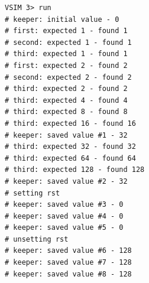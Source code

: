 \begin{code}
\caption{Лог выполнения симуляции \texttt{testbench}.}
\begin{verbatim}
VSIM 3> run
# keeper: initial value - 0
# first: expected 1 - found 1
# second: expected 1 - found 1
# third: expected 1 - found 1
# first: expected 2 - found 2
# second: expected 2 - found 2
# third: expected 2 - found 2
# third: expected 4 - found 4
# third: expected 8 - found 8
# third: expected 16 - found 16
# keeper: saved value #1 - 32
# third: expected 32 - found 32
# third: expected 64 - found 64
# third: expected 128 - found 128
# keeper: saved value #2 - 32
# setting rst
# keeper: saved value #3 - 0
# keeper: saved value #4 - 0
# keeper: saved value #5 - 0
# unsetting rst
# keeper: saved value #6 - 128
# keeper: saved value #7 - 128
# keeper: saved value #8 - 128
\end{verbatim}
\end{code}
